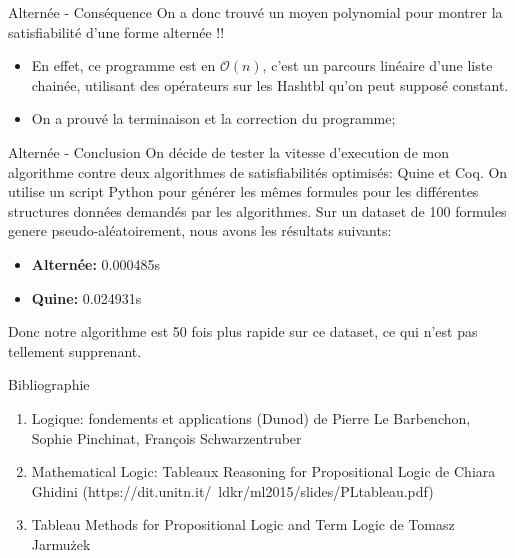 \documentclass[]{beamer}
\begin{document}
\begin{frame}{Alternée - Conséquence}
    On a donc trouvé un moyen polynomial pour montrer la satisfiabilité d'une forme alternée !!
    \pause
    \begin{itemize}
        \item En effet, ce programme est en $\mathcal{O}(n)$, c'est un parcours linéaire d'une liste chainée, utilisant des opérateurs sur les Hashtbl qu'on peut supposé constant.
        \item On a prouvé la terminaison et la correction du programme; 
    \end{itemize}
\end{frame}

\begin{frame}{Alternée - Conclusion}
    On décide de tester la vitesse d'execution de mon algorithme contre deux algorithmes de satisfiabilités optimisés: Quine et Coq.
    On utilise un script Python pour générer les mêmes formules pour les différentes structures données demandés par les algorithmes.
    Sur un dataset de 100 formules genere pseudo-aléatoirement, nous avons les résultats suivants:

    \begin{itemize}
        \item \textbf{Alternée:} 0.000485s
        \item \textbf{Quine:} 0.024931s
    \end{itemize}    
    Donc notre algorithme est 50 fois plus rapide sur ce dataset, ce qui n'est pas tellement supprenant.
\end{frame}


\begin{frame}{Bibliographie}
\begin{enumerate}
    \item Logique: fondements et applications (Dunod) de Pierre Le Barbenchon, Sophie Pinchinat, François Schwarzentruber
    \item Mathematical Logic: Tableaux Reasoning for Propositional Logic de Chiara Ghidini (https://dit.unitn.it/~ldkr/ml2015/slides/PLtableau.pdf)
    \item Tableau Methods  for Propositional Logic and Term Logic de Tomasz Jarmużek
\end{enumerate}
\end{frame}
\end{document}
